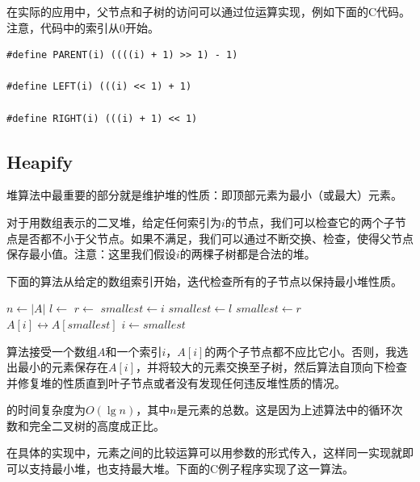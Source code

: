 \documentclass[b5paper]{ctexart}
\begin{document}
在实际的应用中，父节点和子树的访问可以通过位运算实现，例如下面的C代码。注意，代码中的索引从0开始。

\lstset{language=C}
\begin{lstlisting}
#define PARENT(i) ((((i) + 1) >> 1) - 1)

#define LEFT(i) (((i) << 1) + 1)

#define RIGHT(i) (((i) + 1) << 1)
\end{lstlisting}

\subsection{Heapify}

堆算法中最重要的部分就是维护堆的性质：即顶部元素为最小（或最大）元素。

对于用数组表示的二叉堆，给定任何索引为$i$的节点，我们可以检查它的两个子节点是否都不小于父节点。如果不满足，我们可以通过不断交换、检查，使得父节点保存最小值\cite{CLRS}。注意：这里我们假设$i$的两棵子树都是合法的堆。

下面的算法从给定的数组索引开始，迭代检查所有的子节点以保持最小堆性质。

\begin{algorithmic}[1]
  \State $n \gets |A|$
  \Loop
    \State $l \gets$ 
    \State $r \gets$ 
    \State $smallest \gets i$
      \State $smallest \gets l$
    \EndIf
      \State $smallest \gets r$
    \EndIf
      \State {} $A[i] \leftrightarrow A[smallest]$
      \State $i \gets smallest$
    \Else
      \State \Return
    \EndIf
  \EndLoop
\EndFunction
\end{algorithmic}

算法接受一个数组$A$和一个索引$i$，$A[i]$的两个子节点都不应比它小。否则，我选出最小的元素保存在$A[i]$，并将较大的元素交换至子树，然后算法自顶向下检查并修复堆的性质直到叶子节点或者没有发现任何违反堆性质的情况。

的时间复杂度为$O(\lg n)$，其中$n$是元素的总数。这是因为上述算法中的循环次数和完全二叉树的高度成正比。

在具体的实现中，元素之间的比较运算可以用参数的形式传入，这样同一实现就即可以支持最小堆，也支持最大堆。下面的C例子程序实现了这一算法。
\end{document}
